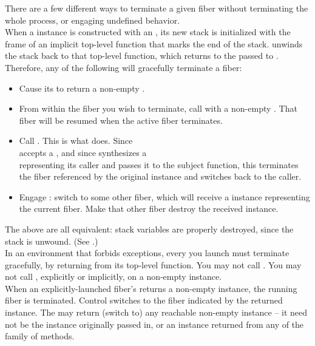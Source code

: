 
There are a few different ways to terminate a given fiber without
terminating the whole process, or engaging undefined behavior.\\

When a \fiber instance is constructed with an \entryfn, its new stack is
initialized with the frame of an implicit top-level function that marks the
end of the stack. \unwindfib unwinds the stack back to
that top-level function, which returns to the \fiber passed to \unwindfib.\\

Therefore, any of the following will gracefully terminate a fiber:

\begin{itemize}
    \item Cause its \entryfn to return a non-empty \fiber.
    \item From within the fiber you wish to terminate, call \unwindfib with a
          non-empty \fiber. That fiber will be resumed
          when the active fiber terminates.
    \item Call . This is what \dtor
          does. Since\\\unwindfib accepts a \fiber, and since \resumewith
          synthesizes a\\\fiber representing its caller and passes it to the
          subject function, this terminates the fiber referenced by the
          original \fiber instance and switches back to the caller.
    \item Engage \dtor: switch to some other fiber, which will
          receive a \fiber instance representing the current fiber. Make that
          other fiber destroy the received \fiber instance.
\end{itemize}

The above are all equivalent: stack variables are properly destroyed, since
the stack is unwound. (See .)\\

In an environment that forbids exceptions, every \fiber you launch must
terminate gracefully, by returning from its top-level function. You may not
call \unwindfib. You may not call \dtor, explicitly or implicitly, on a
non-empty \fiber instance.\\

When an explicitly-launched fiber's \entryfn returns a non-empty \fiber
instance, the running fiber is terminated. Control switches to the fiber
indicated by the returned \fiber instance. The \entryfn may return (switch to)
any reachable non-empty \fiber instance -- it need not be the instance originally
passed in, or an instance returned from any of the \resume family of
methods.\\

